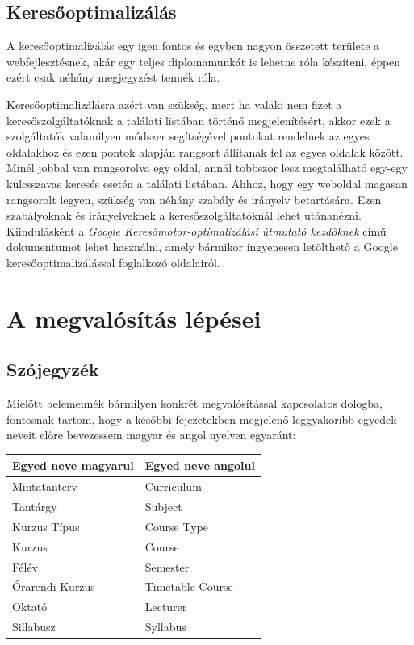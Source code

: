 \documentclass[hidelinks, 12pt, a4paper]{report}
\begin{document}
\section{Keresőoptimalizálás}

A keresőoptimalizálás egy igen fontos és egyben nagyon összetett területe a webfejlesztésnek, akár egy teljes diplomamunkát is lehetne róla készíteni, éppen ezért csak néhány megjegyzést tennék róla.

Keresőoptimalizálásra azért van szükség, mert ha valaki nem fizet a keresőszolgáltatóknak a találati listában történő megjelenítésért, akkor ezek a szolgáltatók valamilyen módszer segítségével pontokat rendelnek az egyes oldalakhoz és ezen pontok alapján rangsort állítanak fel az egyes oldalak között. Minél jobbal van rangsorolva egy oldal, annál többször lesz megtalálható egy-egy kulcsszavas keresés esetén a találati listában. Ahhoz, hogy egy weboldal magasan rangsorolt legyen, szükség van néhány szabály és irányelv betartására. Ezen szabályoknak és irányelveknek a keresőszolgáltatóknál lehet utánanézni. Kiindulásként a \emph{Google Keresőmotor-optimalizálási útmutató kezdőknek} című dokumentumot lehet használni, amely bármikor ingyenesen letölthető a Google keresőoptimalizálással foglalkozó oldalairól.


\chapter{A megvalósítás lépései}

\section{Szójegyzék}

Mielőtt belemennék bármilyen konkrét megvalósítással kapcsolatos dologba, fontosnak tartom, hogy a későbbi fejezetekben megjelenő leggyakoribb egyedek neveit előre bevezessem magyar és angol nyelven egyaránt:


\begin{table}[H]
	\centering
	\begin{tabular}{| l | l |}
	\hline
	\textbf{Egyed neve magyarul} & \textbf{Egyed neve angolul} \\
	\hline
	Mintatanterv & Curriculum \\
	\hline
	Tantárgy & Subject \\
	\hline
	Kurzus Típus & Course Type \\
	\hline
	Kurzus & Course \\
	\hline
	Félév & Semester \\
	\hline
	Órarendi Kurzus & Timetable Course \\
	\hline
	Oktató & Lecturer \\
	\hline
	Sillabusz & Syllabus \\
	\hline
\end{tabular}
\end{table}
\end{document}
